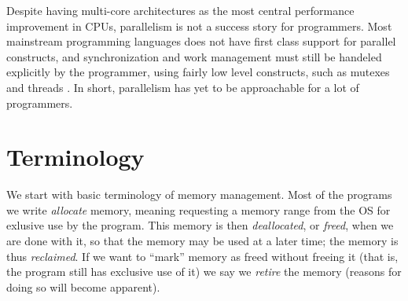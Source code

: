 \documentclass[b5paper,twoside]{report}
\begin{document}
Despite having multi-core architectures as the most central performance
improvement in CPUs, parallelism is not a success story for programmers.
Most mainstream programming languages does not have first class support
for parallel constructs, and synchronization and work management must
still be handeled explicitly by the programmer, using fairly low level
constructs, such as mutexes and threads .
In short, parallelism has yet to be approachable for a lot of programmers.


\subsection*{}

\section{Terminology}
We start with basic terminology of memory management.
Most of the programs we write \emph{allocate} memory, meaning
requesting a memory range from the OS for exlusive use by the program.
This memory is then \emph{deallocated}, or \emph{freed}, when we are done with it,
so that the memory may be used at a later time;
the memory is thus \emph{reclaimed}.
If we want to ``mark'' memory as freed without freeing it (that is, the program
still has exclusive use of it) we say we \emph{retire} the memory
(reasons for doing so will become apparent).
\end{document}
